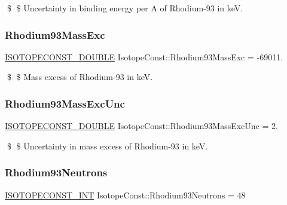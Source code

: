 \$ \$ Uncertainty in binding energy per A of Rhodium-\/93 in keV. \mbox{\label{group___isotope_const-_rhodium-_rh93_ga38f695a355fe22836db836e31cd5a42f}} 
\subsubsection{\texorpdfstring{Rhodium93\+Mass\+Exc}{Rhodium93MassExc}}
{\footnotesize\ttfamily \mbox{\hyperlink{group___isotope_const-_macros_ga8f45a7272ce02c0b4c65c44636ed719a}{I\+S\+O\+T\+O\+P\+E\+C\+O\+N\+S\+T\+\_\+\+D\+O\+U\+B\+LE}} Isotope\+Const\+::\+Rhodium93\+Mass\+Exc = -\/69011.}

\$ \$ Mass excess of Rhodium-\/93 in keV. \mbox{\label{group___isotope_const-_rhodium-_rh93_gabdbdbb5724cbc00f47cb3b867b52224c}} 
\subsubsection{\texorpdfstring{Rhodium93\+Mass\+Exc\+Unc}{Rhodium93MassExcUnc}}
{\footnotesize\ttfamily \mbox{\hyperlink{group___isotope_const-_macros_ga8f45a7272ce02c0b4c65c44636ed719a}{I\+S\+O\+T\+O\+P\+E\+C\+O\+N\+S\+T\+\_\+\+D\+O\+U\+B\+LE}} Isotope\+Const\+::\+Rhodium93\+Mass\+Exc\+Unc = 2.}

\$ \$ Uncertainty in mass excess of Rhodium-\/93 in keV. \mbox{\label{group___isotope_const-_rhodium-_rh93_ga6543b3c101ba3b6d45782ac2b681518c}} 
\subsubsection{\texorpdfstring{Rhodium93\+Neutrons}{Rhodium93Neutrons}}
{\footnotesize\ttfamily \mbox{\hyperlink{group___isotope_const-_macros_ga5f18360b3e99483a35c32d789e62621c}{I\+S\+O\+T\+O\+P\+E\+C\+O\+N\+S\+T\+\_\+\+I\+NT}} Isotope\+Const\+::\+Rhodium93\+Neutrons = 48}

